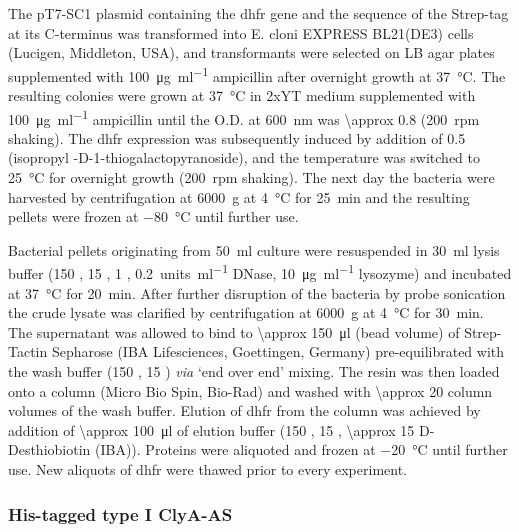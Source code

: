 The pT7-SC1 plasmid containing the \gls{dhfr} gene and the sequence of the Strep-tag at its C-terminus was
transformed into E. cloni\textsuperscript{\textregistered} EXPRESS BL21(DE3) cells (Lucigen, Middleton, USA),
and transformants were selected on LB agar plates supplemented with \SI{100}{\micro\gram\per\milli\litre}
ampicillin after overnight growth at \SI{37}{\celsius}. The resulting colonies were grown at \SI{37}{\celsius}
in 2xYT medium supplemented with \SI{100}{\micro\gram\per\milli\litre} ampicillin until the O.D. at
\SI{600}{\nano\meter} was \num{\approx 0.8} (\SI{200}{rpm} shaking). The \gls{dhfr} expression was
subsequently induced by addition of \SI{0.5}{\mM}  (isopropyl \textbeta-D-1-thiogalactopyranoside),
and the temperature was switched to \SI{25}{\celsius} for overnight growth (200~rpm shaking). The next day the
bacteria were harvested by centrifugation at \SI{6000}{g} at \SI{4}{\celsius} for \SI{25}{\minute} and the
resulting pellets were frozen at \SI{-80}{\celsius} until further use.

Bacterial pellets originating from \SI{50}{\milli\litre} culture were resuspended in \SI{30}{\milli\litre}
lysis buffer (\SI{150}{\mM} , \SI{15}{\mM}  , \SI{1}{\mM} ,
\SI{0.2}{units\per\milli\litre} DNase, \SI{10}{\micro\gram\per\milli\litre} lysozyme) and incubated at
\SI{37}{\celsius} for \SI{20}{\minute}. After further disruption of the bacteria by probe sonication the crude
lysate was clarified by centrifugation at \SI{6000}{g} at \SI{4}{\celsius} for \SI{30}{\minute}. The
supernatant was allowed to bind to \SI{\approx 150}{\micro\litre} (bead volume) of
Strep-Tactin\textsuperscript{\textregistered} Sepharose\textsuperscript{\textregistered} (IBA Lifesciences,
Goettingen, Germany) pre-equilibrated with the wash buffer (\SI{150}{\mM} , \SI{15}{\mM}
 ) \textit{via} `end over end' mixing. The resin was then loaded onto a column (Micro Bio
Spin, Bio-Rad) and washed with \num{\approx 20} column volumes of the wash buffer. Elution of \gls{dhfr} from
the column was achieved by addition of \SI{\approx 100}{\micro\litre} of elution buffer (\SI{150}{\mM}
, \SI{15}{\mM}  , \SI{\approx 15}{\mM} D-Desthiobiotin (IBA)). Proteins were
aliquoted and frozen at \SI{-20}{\celsius} until further use. New aliquots of \gls{dhfr} were thawed prior to
every experiment.


\subsubsection{His-tagged type {I} {ClyA-AS}}
%

